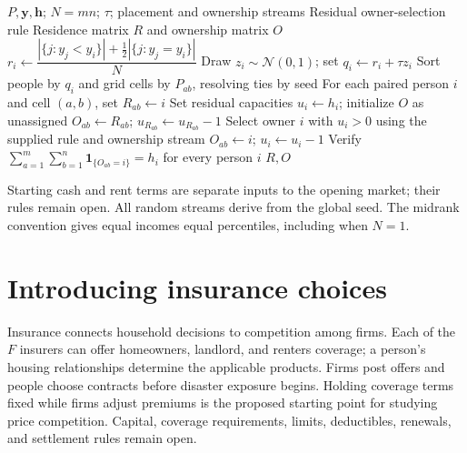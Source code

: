 \documentclass[11pt]{article}
\begin{document}
\begin{algorithm}[H]
\caption{Assign residences and ownership}
\label{alg:board}
\begin{algorithmic}[1]
\Require $P,\mathbf{y},\mathbf{h}$; $N=mn$; $\tau$; placement and ownership streams
\Require Residual owner-selection rule
\Ensure Residence matrix $R$ and ownership matrix $O$
    \State $r_i\gets\dfrac{|\{j:y_j<y_i\}|+\tfrac12|\{j:y_j=y_i\}|}{N}$ 
    \State Draw $z_i\sim\mathcal{N}(0,1)$; set $q_i\gets r_i+\tau z_i$
\EndFor
\State Sort people by $q_i$ and grid cells by $P_{ab}$, resolving ties by seed
\State For each paired person $i$ and cell $(a,b)$, set $R_{ab}\gets i$
\State Set residual capacities $u_i\gets h_i$; initialize $O$ as unassigned
    \State $O_{ab}\gets R_{ab}$; $u_{R_{ab}}\gets u_{R_{ab}}-1$
\EndFor
{}
    \State Select owner $i$ with $u_i>0$ using the supplied rule and ownership stream
    \State $O_{ab}\gets i$; $u_i\gets u_i-1$
\EndFor
\State Verify $\sum_{a=1}^m\sum_{b=1}^n\mathbf{1}_{\{O_{ab}=i\}}=h_i$ for every person $i$
\State \Return $R,O$
\end{algorithmic}
\end{algorithm}

Starting cash and rent terms are separate inputs to the opening market; their rules remain open. All random streams derive from the global seed. The midrank convention gives equal incomes equal percentiles, including when $N=1$.

\section{Introducing insurance choices}
Insurance connects household decisions to competition among firms. Each of the $F$ insurers can offer homeowners, landlord, and renters coverage; a person's housing relationships determine the applicable products. Firms post offers and people choose contracts before disaster exposure begins. Holding coverage terms fixed while firms adjust premiums is the proposed starting point for studying price competition. Capital, coverage requirements, limits, deductibles, renewals, and settlement rules remain open.
\end{document}
